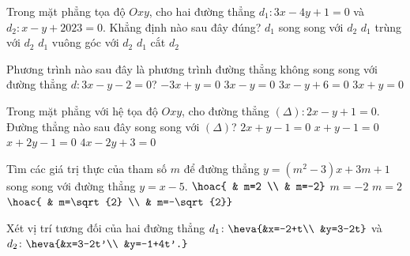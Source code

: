\begin{ex}%
	Trong mặt phẳng tọa độ $Oxy$, cho hai đường thẳng $d_1\colon 3x-4y+1=0$ và $d_2\colon x-y+2023=0$. Khẳng định nào  sau đây đúng?
	 \choice
		{$d_1$ song song với $d_2$} 
		 {$d_1$ trùng với $d_2$}
		{$d_1$  vuông góc với $d_2$}
		 {\True $d_1$ cắt $d_2$}
\end{ex}

\begin{ex}%
	Phương trình nào sau đây là phương  trình đường thẳng không song song với đường thẳng $d \colon 3x-y-2=0$?
	 \choice
		{$-3x+y=0$} 
		 {$3x-y=0$}
		{$3x-y+6=0$} 
		 {$3x+y=0$}
\end{ex}

\begin{ex}%
	Trong mặt phẳng với hệ tọa độ $Oxy$, cho  đường thẳng $(\Delta)\colon 2x-y+1=0$. Đường thẳng nào sau đây song song với $(\Delta)$?
	\choice 
		{$2x+y-1=0$} 
		 {$x+y-1=0$}
		 {$x+2y-1=0$}
		{\True  $4x-2y+3=0$}
\end{ex}

\begin{ex}%
	Tìm các giá trị thực của tham số $m$ để đường thẳng $y=\left(m^2-3\right)x+3m+1$ song song với đường  thẳng $y=x-5$.
	\choice 
		{$\hoac{ & m=2  \\ & m=-2}$}
		 {$m=-2$}
		 {\True $m=2$}
		{$\hoac{ & m=\sqrt{2} \\ &  m=-\sqrt{2}}$}
\end{ex}

\begin{bt}%
	Xét vị trí tương đối của hai đường thẳng 
	 $d_1\colon\heva{&x=-2+t\\ &y=3-2t}$ và $d_2\colon\heva{&x=3-2t'\\ &y=-1+4t'.}$
\end{bt}

